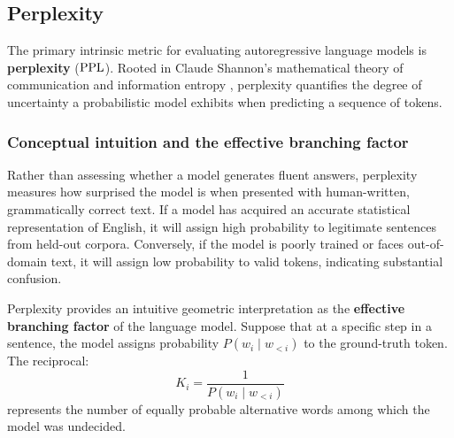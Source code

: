 \documentclass[../../../main.tex]{subfiles}
\begin{document}
\subsection{Perplexity}
\label{subsec:perplexity}

The primary intrinsic metric for evaluating autoregressive language models is \textbf{perplexity} ($\mathrm{PPL}$). Rooted in Claude Shannon's mathematical theory of communication and information entropy \cite{shannon1948}, perplexity quantifies the degree of uncertainty a probabilistic model exhibits when predicting a sequence of tokens.

\subsubsection{Conceptual intuition and the effective branching factor}
Rather than assessing whether a model generates fluent answers, perplexity measures how surprised the model is when presented with human-written, grammatically correct text. If a model has acquired an accurate statistical representation of English, it will assign high probability to legitimate sentences from held-out corpora. Conversely, if the model is poorly trained or faces out-of-domain text, it will assign low probability to valid tokens, indicating substantial confusion.

Perplexity provides an intuitive geometric interpretation as the \textbf{effective branching factor} of the language model. Suppose that at a specific step in a sentence, the model assigns probability $P(w_i \mid w_{<i})$ to the ground-truth token. The reciprocal:
\begin{equation}
\label{eq:equivalent_words_def}
K_i = \frac{1}{P(w_i \mid w_{<i})}
\end{equation}
represents the number of equally probable alternative words among which the model was undecided. 
\end{document}
